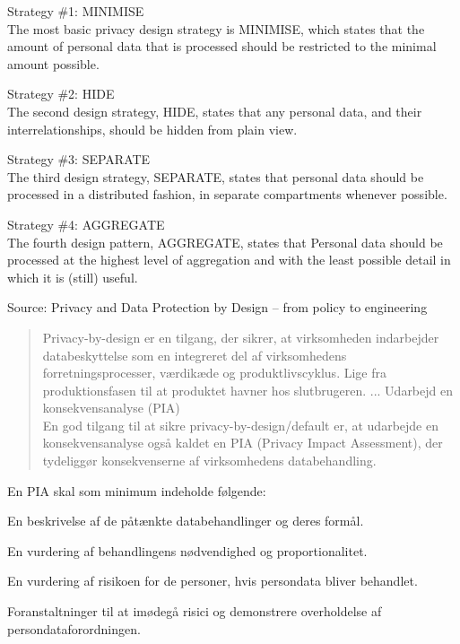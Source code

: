 \documentclass[Screen16to9,17pt]{foils}
\begin{document}

\begin{list2}
\item Strategy \#1: MINIMISE\\
The most basic privacy design strategy is MINIMISE, which states that the amount of personal data
that is processed should be restricted to the minimal amount possible.
\item Strategy \#2: HIDE\\
The second design strategy, HIDE, states that any personal data, and their interrelationships, should
be hidden from plain view.
\item Strategy \#3: SEPARATE\\
The third design strategy, SEPARATE, states that personal data should be processed in a distributed
fashion, in separate compartments whenever possible.
\item Strategy \#4: AGGREGATE\\
The fourth design pattern, AGGREGATE, states that Personal data should be processed at the highest
level of aggregation and with the least possible detail in which it is (still) useful.
\end{list2}

Source: Privacy and Data Protection by Design -- from policy to engineering




\begin{quote}\small
Privacy-by-design er en tilgang, der sikrer, at virksomheden indarbejder databeskyttelse som en integreret del af virksomhedens forretningsprocesser, værdikæde og produktlivscyklus. Lige fra produktionsfasen til at produktet havner hos slutbrugeren.
...
Udarbejd en konsekvensanalyse (PIA)\\
En god tilgang til at sikre privacy-by-design/default er, at udarbejde en konsekvensanalyse også kaldet en PIA (Privacy Impact Assessment), der tydeliggør konsekvenserne af virksomhedens databehandling.
\end{quote}

En PIA skal som minimum indeholde følgende:

\begin{list2}
\item En beskrivelse af de påtænkte databehandlinger og deres formål.
\item En vurdering af behandlingens nødvendighed og proportionalitet.
\item En vurdering af risikoen for de personer, hvis persondata bliver behandlet.
\item Foranstaltninger til at imødegå risici og demonstrere overholdelse af persondataforordningen.
\end{list2}
\end{document}
